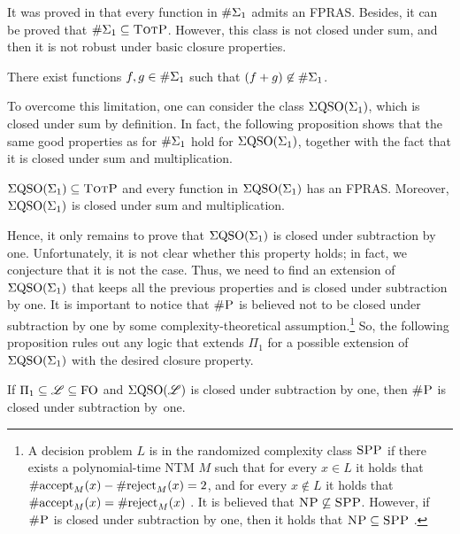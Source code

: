It was proved in \cite{SalujaST95} that every function in $\#\Sigma_{1}$ admits an FPRAS. Besides, it can be proved that $\#\Sigma_{1} \subseteq \text{\sc TotP}$. 
However, 
this class 
is not closed under sum, and then it is not robust under basic closure properties. 
\begin{proposition}\label{prop-e1-nc}
There exist functions $f, g \in \#\Sigma_{1}$ such that $(f + g) \not\in \#\Sigma_{1}$.
\end{proposition}
To overcome this limitation, one can consider the class $\Sigma{\rm QSO}(\Sigma_{1})$, which is closed under sum by definition. In fact, the following proposition shows that the same good properties as for $\#\Sigma_{1}$ hold for $\Sigma{\rm QSO}(\Sigma_{1})$, together with the fact that 
it is closed under sum and multiplication.
\begin{proposition} \label{prop:qe0-fp-qe1-totp-fptras}
$\Sigma{\rm QSO}(\Sigma_{1}) \subseteq \text{\sc TotP}$ and every function in $\Sigma{\rm QSO}(\Sigma_{1})$ has an FPRAS. Moreover, $\Sigma{\rm QSO}(\Sigma_{1})$ is closed under sum and multiplication.
\end{proposition}
Hence, it only remains to prove that $\Sigma{\rm QSO}(\Sigma_{1})$ is closed under subtraction by one. Unfortunately, it is not clear whether this property holds; in fact, we conjecture that it is not the case. Thus, we need to find an extension of $\Sigma{\rm QSO}(\Sigma_{1})$ that keeps all the previous properties and is closed under subtraction by one. It is important to notice that $\text{\sc \#P}$ is believed not to be closed under subtraction by one by some complexity-theoretical assumption.\footnote{A decision problem $L$ is in the randomized complexity class $\text{\sc SPP}$ if there exists a polynomial-time NTM $M$ such that for every $x \in L$ it holds that $\text{\rm \#accept}_M(x) - \text{\rm \#reject}_M(x) = 2$, and for every $x \not\in L$ it holds that $\text{\rm \#accept}_M(x) = \text{\rm \#reject}_M(x)$ \cite{OH93,FFK94}. It is believed that $\text{\sc NP} \not\subseteq \text{\sc SPP}$.
However, if $\text{\sc \#P}$ is closed under subtraction by one, then it holds that $\text{\sc NP} \subseteq \text{\sc SPP}$ \cite{OH93}.} So, the following proposition rules out any logic that extends $\Pi_1$ for a possible extension of~$\Sigma{\rm QSO}(\Sigma_{1})$ with the desired closure property.
\begin{proposition} \label{pi-minusone}
If $\Pi_1 \subseteq \mathscr{L} \subseteq {\rm FO}$ and $\Sigma{\rm QSO}(\mathscr{L})$ is closed under subtraction by one, then $\text{\sc \#P}$ is closed under subtraction by~one. 
\end{proposition}

